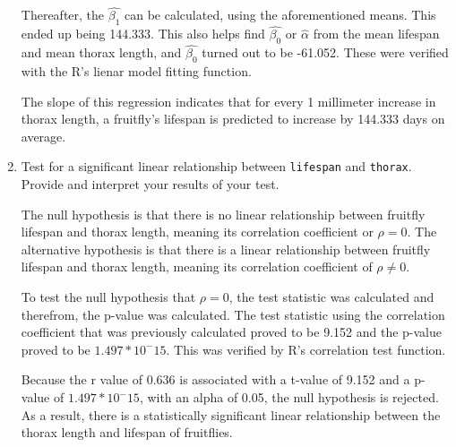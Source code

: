\documentclass[12pt,letterpaper]{article}
\begin{document}
\begin{enumerate}
	\vspace{.5cm}
	
	Thereafter, the $\hat{\beta_1}$ can be calculated, using the aforementioned means. This ended up being 144.333. This also helps find $\hat{\beta_0}$ or $\hat{\alpha}$ from the mean lifespan and mean thorax length, and $\hat{\beta_0}$ turned out to be -61.052. These were verified with the R's lienar model fitting function.
	
	 
	
	\vspace{.5cm}
	
	The slope of this regression indicates that for every 1 millimeter increase in thorax length, a fruitfly's lifespan is predicted to increase by 144.333 days on average.
	
	
			\vspace{.5cm}
	\item
	Test for a significant linear relationship between  \texttt{lifespan} and \texttt{thorax}. Provide and interpret your results of your test.
	
	\vspace{.5cm}
	
	The null hypothesis is that there is no linear relationship between fruitfly lifespan and thorax length, meaning its correlation coefficient or $\rho = 0$. The alternative hypothesis is that there is a linear relationship between fruitfly lifespan and thorax length, meaning its correlation coefficient of $\rho \neq 0$.
	
	\vspace{.5cm}
	
	To test the null hypothesis that $\rho = 0$, the test statistic was calculated and therefrom, the p-value was calculated. The test statistic using the correlation coefficient that was previously calculated proved to be 9.152 and the p-value proved to be $1.497*10^-15$. This was verified by R's correlation test function.
	
	 
	
	\vspace{.5cm}
	
	Because the r value of 0.636 is associated with a t-value of 9.152 and a p-value of $1.497*10^-15$, with an alpha of 0.05, the null hypothesis is rejected. As a result, there is a statistically significant linear relationship between the thorax length and lifespan of fruitflies.
	

\end{enumerate}
\end{document}
